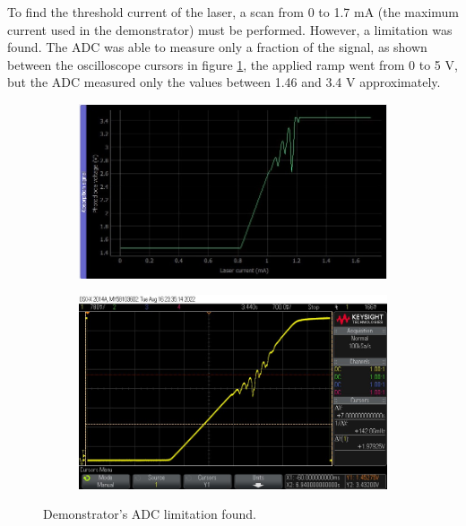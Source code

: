 \documentclass[a4paper,12pt]{article}
\begin{document}
To find the threshold current of the laser, a scan from 0 to 1.7 mA (the maximum current used in the demonstrator) must be performed. However, a limitation was found. The ADC was able to measure only a fraction of the signal, as shown between the oscilloscope cursors in figure \ref{fig:adc_limitation}, the applied ramp went from 0 to 5 V, but the ADC measured only the values between 1.46 and 3.4 V approximately.
\begin{figure}[!h]
\centering
\begin{subfigure}[b]{0.49\textwidth}
	\centering
	\includegraphics[height=0.6\textwidth]{Images/fsr_screenshot.jpg}
	\captionsetup{justification=centering}
\end{subfigure}
\hfill
\begin{subfigure}[b]{0.49\textwidth}
	\centering
	\includegraphics[height=0.6\textwidth]{Images/fsr_oscilloscope.jpg}
	\captionsetup{justification=centering}
\end{subfigure}
 \caption{Demonstrator's ADC limitation found.}
\label{fig:adc_limitation}
\end{figure}
\end{document}
